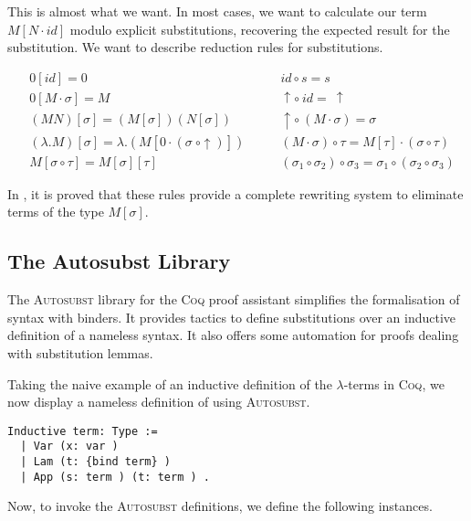 This is almost what we want. 
In most cases, we want to calculate our term $M[N \cdot id]$ modulo explicit substitutions, recovering the expected result for the substitution. We want to describe reduction rules for substitutions.
	
\begin{definition}
	\begin{align*}
		& 0[id] = 0 \qquad
		& id \circ s = s \\
		& 0[M \cdot \sigma] = M \qquad
		& \uparrow \circ \ id = \ \uparrow \\
		& (M N)[\sigma] = (M[\sigma])(N[\sigma]) \qquad
		& \uparrow \circ \ (M \cdot \sigma) = \sigma \\
		& (\lambda . M)[\sigma] = \lambda . (M[0 \cdot (\sigma \ \circ \uparrow)]) \qquad
		& (M \cdot \sigma) \circ \tau = M[\tau] \cdot (\sigma \circ \tau) \\
		& M[\sigma \circ \tau] = M[\sigma][\tau] \qquad
		& (\sigma_1 \circ \sigma_2) \circ \sigma_3 = \sigma_1 \circ (\sigma_2 \circ \sigma_3)
	\end{align*}
\end{definition}

In \cite{Abadi}, it is proved that these rules provide a complete rewriting system to eliminate terms of the type $M[\sigma]$.

\subsection{The Autosubst Library}
\cite{AutosubstSchafer}

The \textsc{Autosubst} library for the \textsc{Coq} proof assistant simplifies the formalisation of syntax with binders.
It provides tactics to define substitutions over an inductive definition of a nameless syntax.
It also offers some automation for proofs dealing with substitution lemmas.

Taking the naive example of an inductive definition of the $\lambda$-terms in \textsc{Coq}, we now display a nameless definition of using \textsc{Autosubst}.

\begin{lstlisting}[language=Coq]
  Inductive term: Type :=
  | Var (x: var )
  | Lam (t: {bind term} )
  | App (s: term ) (t: term ) .
\end{lstlisting}

Now, to invoke the \textsc{Autosubst} definitions, we define the following instances.

